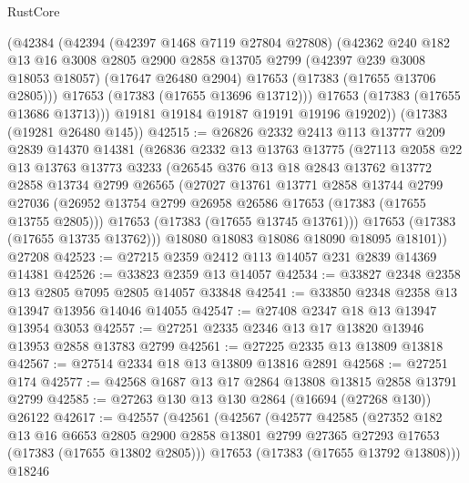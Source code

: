 \begin{lexlean}{RustCore}
\begin{coremodule}
        (@42384
          (@42394
            (@42397 @1468 @7119 @27804 @27808)
            (@42362
              @240
              @182
              @13
              @16
              @3008
              @2805
              @2900
              @2858
              @13705
              @2799
              (@42397 @239 @3008 @18053 @18057)
              (@17647 @26480 @2904)
              @17653
              (@17383 (@17655 @13706 @2805)))
            @17653
            (@17383 (@17655 @13696 @13712)))
          @17653
          (@17383 (@17655 @13686 @13713)))
        @19181
        @19184
        @19187
        @19191
        @19196
        @19202))
    (@17383 (@19281 @26480 @145))
@42515 := @26826
    @2332
    @2413
    @113
    @13777
    @209
    @2839
    @14370
    @14381
    (@26836
      @2332
      @13
      @13763
      @13775
      (@27113
        @2058
        @22
        @13
        @13763
        @13773
        @3233
        (@26545
          @376
          @13
          @18
          @2843
          @13762
          @13772
          @2858
          @13734
          @2799
          @26565
          (@27027
            @13761
            @13771
            @2858
            @13744
            @2799
            @27036
            (@26952 @13754 @2799 @26958 @26586 @17653 (@17383 (@17655 @13755 @2805)))
            @17653
            (@17383 (@17655 @13745 @13761)))
          @17653
          (@17383 (@17655 @13735 @13762)))
        @18080
        @18083
        @18086
        @18090
        @18095
        @18101))
    @27208
@42523 := @27215 @2359 @2412 @113 @14057 @231 @2839 @14369 @14381
@42526 := @33823 @2359 @13 @14057
@42534 := @33827 @2348 @2358 @13 @2805 @7095 @2805 @14057 @33848
@42541 := @33850 @2348 @2358 @13 @13947 @13956 @14046 @14055
@42547 := @27408 @2347 @18 @13 @13947 @13954 @3053
@42557 := @27251 @2335 @2346 @13 @17 @13820 @13946 @13953 @2858 @13783 @2799
@42561 := @27225 @2335 @13 @13809 @13818
@42567 := @27514 @2334 @18 @13 @13809 @13816 @2891
@42568 := @27251 @174
@42577 := @42568 @1687 @13 @17 @2864 @13808 @13815 @2858 @13791 @2799
@42585 := @27263 @130 @13 @130 @2864 (@16694 (@27268 @130)) @26122
@42617 := @42557
    (@42561
      (@42567
        (@42577
          @42585
          (@27352
            @182
            @13
            @16
            @6653
            @2805
            @2900
            @2858
            @13801
            @2799
            @27365
            @27293
            @17653
            (@17383 (@17655 @13802 @2805)))
          @17653
          (@17383 (@17655 @13792 @13808)))
        @18246

\end{coremodule}
\end{lexlean}
